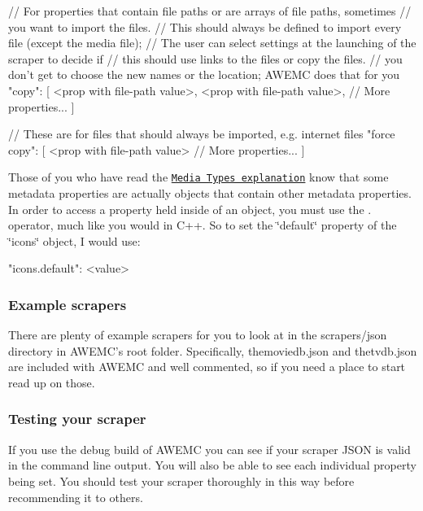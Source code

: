 \begin{DoxyVerb}
{    // For properties that contain file paths or are arrays of file paths, sometimes 
    // you want to import the files.
    // This should always be defined to import every file (except the media file);
    // The user can select settings at the launching of the scraper to decide if
    // this should use links to the files or copy the files.
    // you don't get to choose the new names or the location; AWEMC does that for you
    "copy": [
        <prop with file-path value>,
        <prop with file-path value>,
        // More properties...   
    ]

    // These are for files that should always be imported, e.g. internet files
    "force copy": [
        <prop with file-path value>
        // More properties...
    ]
}
\end{DoxyVerb}


Those of you who have read the \href{../type/README.md>}{\tt Media Types explanation} know that some metadata properties are actually objects that contain other metadata properties. In order to access a property held inside of an object, you must use the {\ttfamily .} operator, much like you would in C++. So to set the \char`\"{}default\char`\"{} property of the \char`\"{}icons\char`\"{} object, I would use\-:

\begin{DoxyVerb}"icons.default": <value>
\end{DoxyVerb}


\subsubsection*{Example scrapers}

There are plenty of example scrapers for you to look at in the {\ttfamily scrapers/json} directory in A\-W\-E\-M\-C's root folder. Specifically, {\ttfamily themoviedb.\-json} and {\ttfamily thetvdb.\-json} are included with A\-W\-E\-M\-C and well commented, so if you need a place to start read up on those.

\subsubsection*{Testing your scraper}

If you use the debug build of A\-W\-E\-M\-C you can see if your scraper J\-S\-O\-N is valid in the command line output. You will also be able to see each individual property being set. You should test your scraper thoroughly in this way before recommending it to others. 
